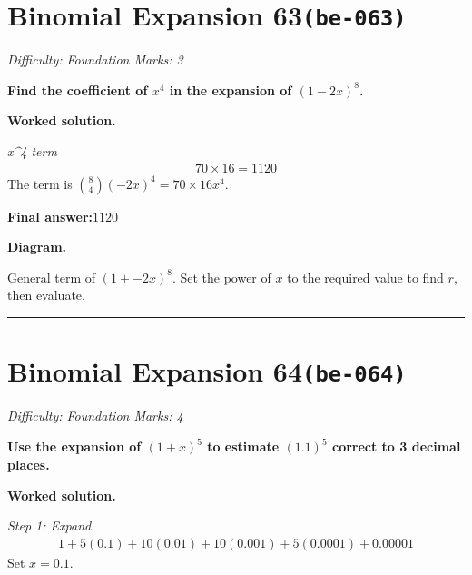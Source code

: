 \documentclass[11pt]{article}
\newcommand{\question}[1]{\par\medskip\noindent\textbf{#1}\par}
\begin{document}
\section*{Binomial Expansion 63\quad\small\texttt{(be-063)}}
\textit{Difficulty: Foundation \quad\textbar\quad Marks: 3}

\question{Find the coefficient of \( x^4 \) in the expansion of \( (1 - 2x)^8 \).}

\textbf{Worked solution.}

\textit{x\textasciicircum 4 term}
\[\begin{gathered}
70 \times 16 = 1120
\end{gathered}\]
The term is \( \binom{8}{4}(-2x)^4 = 70 \times 16x^4 \).

\begin{answerbox}
\textbf{Final answer:}\quad \(\displaystyle 1120\)
\end{answerbox}
\textbf{Diagram.}

\begin{center}
\end{center}
\small General term of $\left(1+-2x\right)^{8}$. Set the power of $x$ to the required value to find $r$, then evaluate.\normalsize

\medskip\hrule

\section*{Binomial Expansion 64\quad\small\texttt{(be-064)}}
\textit{Difficulty: Foundation \quad\textbar\quad Marks: 4}

\question{Use the expansion of \( (1 + x)^5 \) to estimate \( (1.1)^5 \) correct to 3 decimal places.}

\textbf{Worked solution.}

\textit{Step 1: Expand}
\[\begin{gathered}
1 + 5(0.1) + 10(0.01) + 10(0.001) + 5(0.0001) + 0.00001
\end{gathered}\]
Set \( x = 0.1 \).
\end{document}
